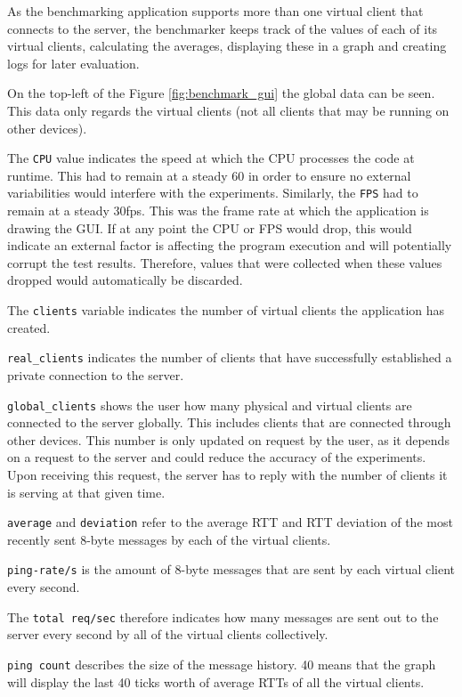 \documentclass[bsc, 12pt, twoside, singlespacing, parskip, abbrevs, notimes, normalheadings, logo]{styles/infthesis}
\begin{document}
As the benchmarking application supports more than one virtual client that connects to the server, the benchmarker keeps track of the values of each of its virtual clients, calculating the averages, displaying these in a graph and creating logs for later evaluation.

On the top-left of the Figure \ref{fig:benchmark_gui} the global data can be seen. This data only regards the virtual clients (not all clients that may be running on other devices). 

The \texttt{CPU} value indicates the speed at which the CPU processes the code at runtime. This had to remain at a steady 60 in order to ensure no external variabilities would interfere with the experiments. Similarly, the \texttt{FPS} had to remain at a steady 30fps. This was the frame rate at which the application is drawing the GUI. If at any point the CPU or FPS would drop, this would indicate an external factor is affecting the program execution and will potentially corrupt the test results. Therefore, values that were collected when these values dropped would automatically be discarded.

The \texttt{clients} variable indicates the number of virtual clients the application has created. 

\texttt{real\_clients} indicates the number of clients that have successfully established a private connection to the server.

\texttt{global\_clients} shows the user how many physical and virtual clients are connected to the server globally. This includes clients that are connected through other devices. This number is only updated on request by the user, as it depends on a request to the server and could reduce the accuracy of the experiments. Upon receiving this request, the server has to reply with the number of clients it is serving at that given time.

\texttt{average} and \texttt{deviation} refer to the average RTT and RTT deviation of the most recently sent 8-byte messages by each of the virtual clients.

\texttt{ping-rate/s} is the amount of 8-byte messages that are sent by each virtual client every second.

The \texttt{total req/sec} therefore indicates how many messages are sent out to the server every second by all of the virtual clients collectively.

\texttt{ping count} describes the size of the message history. 40 means that the graph will display the last 40 ticks worth of average RTTs of all the virtual clients.
\end{document}
